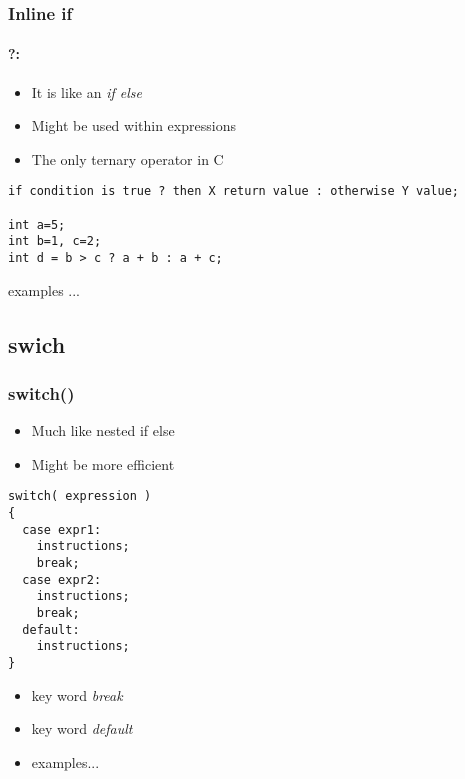 \documentclass[10pt]{beamer}
\begin{document}
\begin{frame}[fragile]
  \frametitle{Inline if}
  \framesubtitle{?:}
  \begin{itemize}
    \item It is like an \textit{if else}
    \item Might be used within expressions
    \item The only ternary operator in C
  \end{itemize}
  \begin{lstlisting}
if condition is true ? then X return value : otherwise Y value;

int a=5;
int b=1, c=2;
int d = b > c ? a + b : a + c;
    \end{lstlisting}
    
    examples ...
\end{frame}

\subsection{swich}

\begin{frame}[fragile]
  \frametitle{switch()}
  \begin{itemize}
    \item Much like nested if else
    \item Might be more efficient
  \end{itemize}
  
    \begin{lstlisting}
switch( expression )
{
  case expr1:
    instructions;
    break;
  case expr2:
    instructions;
    break;
  default:
    instructions;
}
    \end{lstlisting}
    
    \begin{itemize}
      \item key word \textit{break}
      \item key word \textit{default}
      \item examples...
    \end{itemize}
\end{frame}
\end{document}
